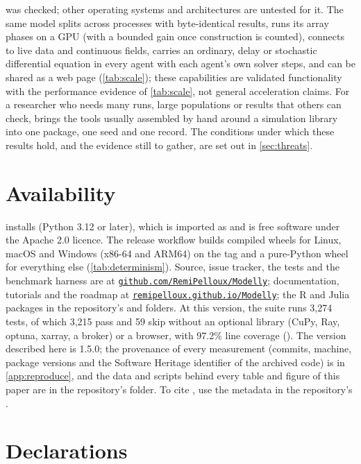 was checked; other operating systems and architectures are untested for it. The same model splits across processes with byte-identical results, runs its array
phases on a GPU (with a bounded gain once construction is counted), connects to live data and
continuous fields, carries an ordinary, delay or stochastic differential equation in every
agent with each agent's own solver steps, and can be shared as a web page (\cref{tab:scale}); these capabilities are
validated functionality with the performance evidence of \cref{tab:scale}, not general
acceleration claims. For a researcher who
needs many runs, large populations or results that others can check, \modelly{} brings the
tools usually assembled by hand around a simulation library into one package, one seed and one
record. The conditions under which these results hold, and the evidence still to gather, are
set out in \cref{sec:threats}.

\section{Availability}
\label{sec:availability}

 installs \modelly{} (Python 3.12 or later), which is imported as
 and is free software under the Apache 2.0 licence. The release workflow builds
compiled wheels for Linux, macOS and Windows (x86-64 and ARM64) on the tag and a pure-Python
wheel for everything else (\cref{tab:determinism}). Source, issue tracker, the tests and the benchmark harness are at
\href{https://github.com/RemiPelloux/Modelly}{\nolinkurl{github.com/RemiPelloux/Modelly}};
documentation, tutorials and the roadmap at
\href{https://remipelloux.github.io/Modelly/}{\nolinkurl{remipelloux.github.io/Modelly}};
the R and Julia packages in the repository's  and 
folders. At this version, the suite runs 3,274 tests, of which 3,215 pass and 59 skip without an optional
library (CuPy, Ray, optuna, xarray, a broker) or a browser, with 97.2\% line coverage (). The version described here is 1.5.0; the provenance of every measurement (commits,
machine, package versions and the Software Heritage identifier of the archived code) is in
\cref{app:reproduce}, and the data and scripts behind every table and figure of this paper
are in the repository's  folder. To cite \modelly{}, use the metadata in the
repository's .

\section*{Declarations}

